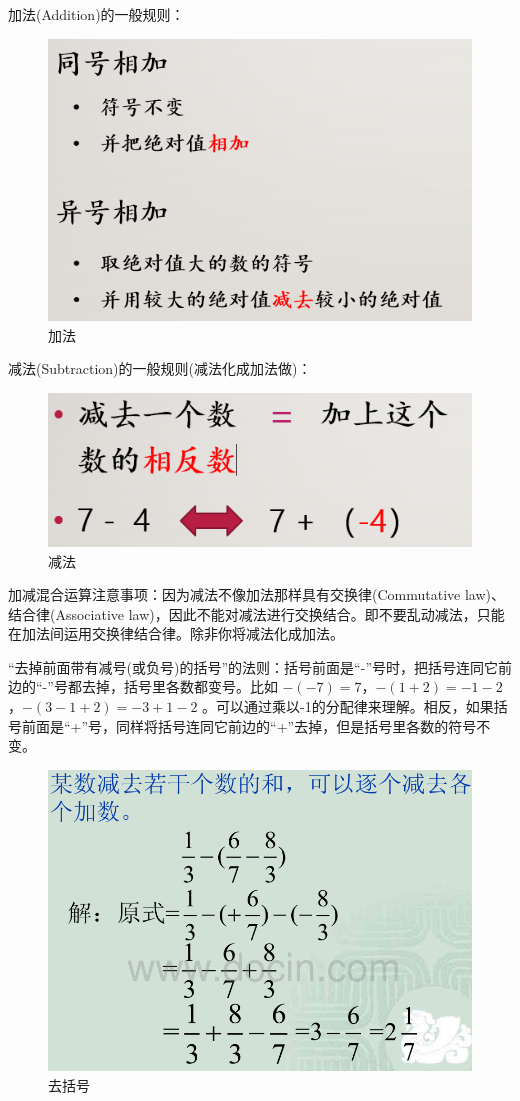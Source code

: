 \documentclass[UTF8,12pt]{ctexart}
\begin{document}
加法(Addition)的一般规则：
\begin{figure}[htb]
\centering
\includegraphics[width = .55\textwidth]{addition.png}
\caption{加法}
\label{fig:addtion}
\end{figure}

减法(Subtraction)的一般规则(减法化成加法做)：
\begin{figure}[htb]
\centering
\includegraphics[width = .55\textwidth]{subtraction.png}
\caption{减法}
\label{fig:subtraction}
\end{figure}

加减混合运算注意事项：因为减法不像加法那样具有交换律(Commutative law)、结合律(Associative law)，因此不能对减法进行交换结合。即不要乱动减法，只能在加法间运用交换律结合律。除非你将减法化成加法。

“去掉前面带有减号(或负号)的括号”的法则：括号前面是“-”号时，把括号连同它前边的“-”号都去掉，括号里各数都变号。比如 $ -(-7) = 7 $，$ -(1+2) = -1-2 $，$ -(3-1+2) = -3+1-2 $ 。可以通过乘以-1的分配律来理解。相反，如果括号前面是“+”号，同样将括号连同它前边的“+”去掉，但是括号里各数的符号不变。

\begin{figure}[htb]
\centering
\includegraphics[width = .55\textwidth]{quit-bracket.png}
\caption{去括号}
\label{fig:quit-bracket}
\end{figure}
\end{document}

